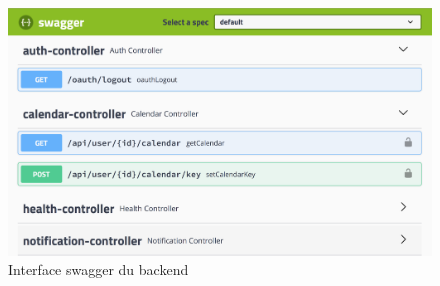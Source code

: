        \begin{figure}[hp] \centering
            \centering
            \includegraphics[width=\textwidth]{Figures/swagger}
            \caption{Interface swagger du backend}
            \label{fig.swagger}
        \end{figure}
        
                